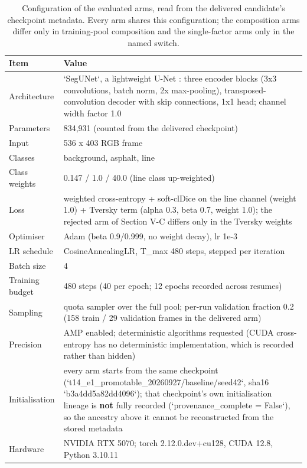 \documentclass[journal]{IEEEtran}
\begin{document}
\begin{table}[!t]
\centering
\caption{Configuration of the evaluated arms, read from the delivered candidate's checkpoint metadata. Every arm shares this configuration; the composition arms differ only in training-pool composition and the single-factor arms only in the named switch.}
\begin{tabular}{@{}ll@{}}
\toprule
Item & Value \\
\midrule
Architecture & `SegUNet`, a lightweight U-Net \cite{ronneberger2015unet}: three encoder blocks (3x3 convolutions, batch norm, 2x max-pooling), transposed-convolution decoder with skip connections, 1x1 head; channel width factor 1.0 \\
Parameters & 834,931 (counted from the delivered checkpoint) \\
Input & 536 x 403 RGB frame \\
Classes & background, asphalt, line \\
Class weights & 0.147 / 1.0 / 40.0 (line class up-weighted) \\
Loss & weighted cross-entropy + soft-clDice on the line channel (weight 1.0) + Tversky term \cite{salehi2017tversky} (alpha 0.3, beta 0.7, weight 1.0); the rejected arm of Section V-C differs only in the Tversky weights \\
Optimiser & Adam (beta 0.9/0.999, no weight decay), lr 1e-3 \\
LR schedule & CosineAnnealingLR, T_max 480 steps, stepped per iteration \\
Batch size & 4 \\
Training budget & 480 steps (40 per epoch; 12 epochs recorded across resumes) \\
Sampling & quota sampler over the full pool; per-run validation fraction 0.2 (158 train / 29 validation frames in the delivered arm) \\
Precision & AMP enabled; deterministic algorithms requested (CUDA cross-entropy has no deterministic implementation, which is recorded rather than hidden) \\
Initialisation & every arm starts from the same checkpoint (`t14_e1_promotable_20260927/baseline/seed42`, sha16 `b3a4dd5a82dd4096`); that checkpoint's own initialisation lineage is \textbf{not} fully recorded (`provenance_complete = False`), so the ancestry above it cannot be reconstructed from the stored metadata \\
Hardware & NVIDIA RTX 5070; torch 2.12.0.dev+cu128, CUDA 12.8, Python 3.10.11 \\

\end{tabular}
\end{table}
\end{document}

